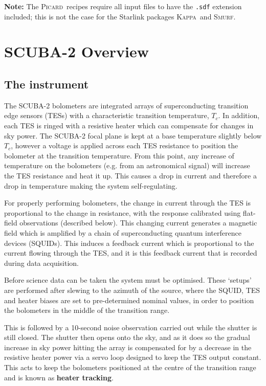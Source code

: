 \documentclass[twoside,11pt]{article}
\newcommand{\xref}[3]{#1}
\newcommand{\xlabel}[1]{}
\renewcommand{\_}{\texttt{\symbol{95}}}
\newcommand{\Kappa}{\xref{\textsc{Kappa}}{sun95}{}}
\newcommand{\picard}{\xref{\textsc{Picard}}{sun265}{}}
\newcommand{\smurf}{\xref{\textsc{Smurf}}{sun258}{}}
\begin{document}
\textbf{Note:} The \picard\ recipes require all input files to have
the \texttt{.sdf} extension included; this is not the case for the
Starlink packages \Kappa\ and \smurf.

\clearpage
\section{\xlabel{scuba2_overview}SCUBA-2 Overview}
\subsection{\xlabel{scuba2}The instrument}
\label{sec:s2}

The SCUBA-2 bolometers are integrated arrays of superconducting
transition edge sensors (TESs) with a characteristic transition
temperature, $T_c$. In addition, each TES is ringed with a resistive
heater which can compensate for changes in sky power. The SCUBA-2
focal plane is kept at a base temperature slightly below $T_c$,
however a voltage is applied across each TES resistance to position
the bolometer at the transition temperature.  From this point, any
increase of temperature on the bolometers (e.g. from an astronomical
signal) will increase the TES resistance and heat it up. This causes a
drop in current and therefore a drop in temperature making the system
self-regulating.

For properly performing bolometers, the change in current through the
TES is proportional to the change in resistance, with the response
calibrated using flat-field observations (described below). This
changing current generates a magnetic field which is amplified by a
chain of superconducting quantum interference devices (SQUIDs). This
induces a feedback current which is proportional to the current
flowing through the TES, and it is this feedback current that is
recorded during data acquisition.

Before science data can be taken the system must be optimised. These
`setups' are performed after slewing to the azimuth of the source,
where the SQUID, TES and heater biases are set to pre-determined
nominal values, in order to position the bolometers in the middle of
the transition range.

This is followed by a 10-second noise observation carried out while
the shutter is still closed. The shutter then opens onto the sky, and
as it does so the gradual increase in sky power hitting the array is
compensated for by a decrease in the resistive heater power via a
servo loop designed to keep the TES output constant. This acts to keep
the bolometers positioned at the centre of the transition range and is
known as \textbf{heater tracking}.
\end{document}
